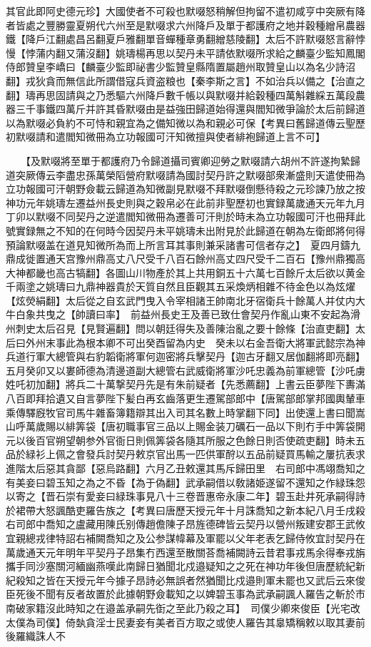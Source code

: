 其官此即阿史德元珍】大國使者不可殺也默啜怒稍解但拘留不遣初咸亨中突厥有降者皆處之豐勝靈夏朔代六州至是默啜求六州降戶及單于都護府之地并穀種繒帛農器鐵【降戶江翻處昌呂翻夏戶雅翻單音蟬種章勇翻繒慈陵翻】太后不許默啜怒言辭悖慢【悖蒲内翻又蒲沒翻】姚璹楊再思以契丹未平請依默啜所求給之麟臺少監知鳳閣侍郎贊皇李嶠曰【麟臺少監即祕書少監贊皇縣隋置屬趙州取贊皇山以為名少詩沼翻】戎狄貪而無信此所謂借寇兵資盗粮也【秦李斯之言】不如治兵以備之【治直之翻】璹再思固請與之乃悉驅六州降戶數千帳以與默啜并給穀種四萬斛雜綵五萬段農器三千事鐵四萬斤并許其昏默啜由是益強田歸道始得還與閻知微爭論於太后前歸道以為默啜必負約不可恃和親宜為之備知微以為和親必可保【考異曰舊歸道傳云聖歷初默啜請和遣閻知微冊為立功報國可汗知微擅與使者緋袍歸道上言不可】

　　【及默啜將至單于都護府乃令歸道攝司賓卿迎勞之默啜請六胡州不許遂拘縶歸道突厥傳云李盡忠孫萬榮䧟營府默啜請為國討契丹許之默啜部衆漸盛則天遣使冊為立功報國可汗朝野僉載云歸道為知微副見默啜不拜默啜倒懸待殺之元珍諫乃放之按神功元年姚璹左遷益州長史則與之穀帛必在此前非聖歷初也實録萬歲通天元年九月丁卯以默啜不同契丹之逆遣閻知微冊為遷善可汗則於時未為立功報國可汗也冊拜此號實録無之不知的在何時今因契丹未平姚璹未出附見於此歸道在朝為左衛郎將何得預論默啜盖在道見知微所為而上所言耳其事則兼采諸書可信者存之】　夏四月鑄九鼎成徙置通天宫豫州鼎高丈八尺受千八百石餘州高丈四尺受千二百石【豫州鼎獨高大神都畿也高古犒翻】各圖山川物產於其上共用銅五十六萬七百餘斤太后欲以黄金千兩塗之姚璹曰九鼎神器貴於天質自然且臣觀其五采煥炳相雜不待金色以為炫燿【炫熒絹翻】太后從之自玄武門曳入令宰相諸王帥南北牙宿衛兵十餘萬人并仗内大牛白象共曳之【帥讀曰率】　前益州長史王及善已致仕會契丹作亂山東不安起為滑州刺史太后召見【見賢遍翻】問以朝廷得失及善陳治亂之要十餘條【治直吏翻】太后曰外州末事此為根本卿不可出癸酉留為内史　癸未以右金吾衛大將軍武懿宗為神兵道行軍大總管與右豹韜衛將軍何迦密將兵擊契丹【迦古牙翻又居伽翻將即亮翻】五月癸卯又以婁師德為清邊道副大總管右武威衛將軍沙吒忠義為前軍總管【沙吒虜姓吒初加翻】將兵二十萬撃契丹先是有朱前疑者【先悉薦翻】上書云臣夢陛下夀滿八百即拜拾遺又自言夢陛下髪白再玄齒落更生遷駕部郎中【唐駕部郎掌邦國輿輦車乘傳驛廐牧官司馬牛雜畜簿籍辯其出入司其名數上時掌翻下同】出使還上書曰聞嵩山呼萬歲賜以緋筭袋【唐初職事官三品以上賜金装刀礪石一品以下則冇手中筭袋開元以後百官朔望朝参外官衙日則佩筭袋各隨其所服之色餘日則否使疏吏翻】時未五品於緑衫上佩之會發兵討契丹敕京官出馬一匹供軍酧以五品前疑買馬輸之屢抗表求進階太后惡其貪鄙【惡烏路翻】六月乙丑敕還其馬斥歸田里　右司郎中馮翊喬知之有美妾曰碧玉知之為之不昏【為于偽翻】武承嗣借以敎諸姫遂留不還知之作緑珠怨以寄之【晋石崇有愛妾曰緑珠事見八十三卷晋惠帝永康二年】碧玉赴井死承嗣得詩於裙帶大怒諷酷吏羅告族之【考異曰唐歷天授元年十月誅喬知之新本紀八月壬戌殺右司郎中喬知之盧藏用陳氏别傳趙儋陳子昂旌德碑皆云契丹以營州叛建安郡王武攸宜親總戎律特詔右補闕喬知之及公参謀幃幕及軍罷以父年老表乞歸侍攸宜討契丹在萬歲通天元年明年平契丹子昂集冇西還至散關荅喬補闕詩云昔君事戎馬余得奉戎旃攜手同沙塞關河緬幽燕嘆此南歸日猶聞北戍邉疑知之之死在神功年後但唐歷統紀新紀殺知之皆在天授元年今據子昂詩必無誤者然猶聞比戍邉則軍未罷也又武后云來俊臣死後不聞有反者故置於此據朝野僉載知之以婢碧玉事為武承嗣諷人羅告之斬於市南破家籍沒此時知之在邉盖承嗣先衘之至此乃殺之耳】　司僕少卿來俊臣【光宅改太僕為司僕】倚埶貪淫士民妻妾有美者百方取之或使人羅告其辠矯稱敕以取其妻前後羅織誅人不